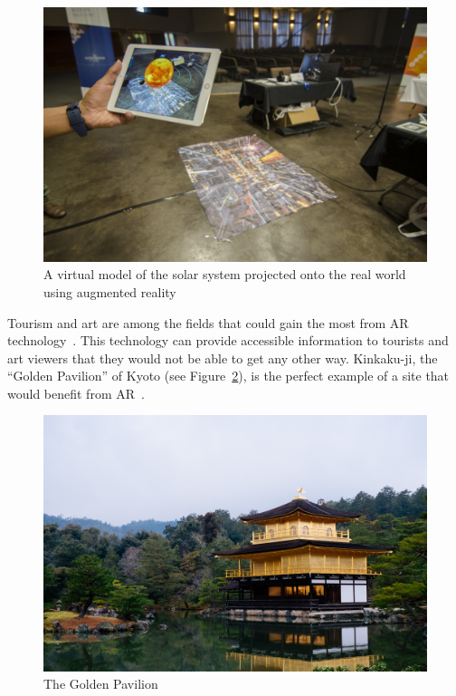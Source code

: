 \documentclass[a4paper, 10pt, american, titlepage]{article}
\begin{document}
\begin{figure}[h]
	\centering
	\includegraphics[width=\textwidth]{ar-example.jpg}
	\caption[A virtual model of the solar system projected onto the real world
	using AR]{A virtual model of the solar system projected onto the real world
		using augmented reality~\autocite{tedx2016}}
	\label{fig:arExample}
\end{figure}

Tourism and art are among the fields that could gain the most from AR
technology~\autocite{saenz2009, katz2018}. This technology can provide
accessible information to tourists and art viewers that they would not be able
to get any other way. Kinkaku-ji, the ``Golden Pavilion'' of Kyoto (see
Figure~\ref{fig:kinkakuji1}), is the perfect example of a site that would benefit
from AR~\autocite{bornoff2000}.

\begin{figure}[h]
	\centering
	\includegraphics[width=\textwidth]{kinkakuji-1.jpg}
	\caption[The Golden Pavilion]{The Golden Pavilion~\autocite{fan2018}}
	\label{fig:kinkakuji1}
\end{figure}
\end{document}

